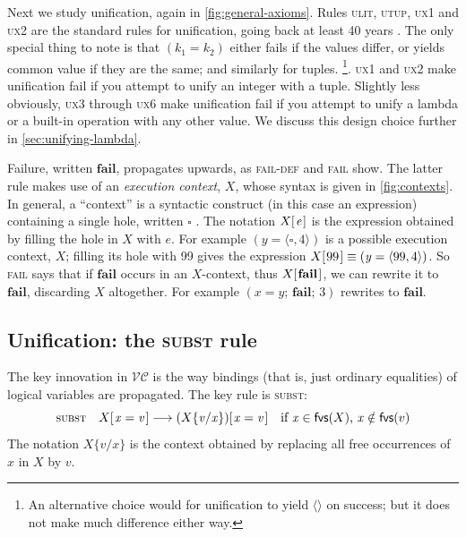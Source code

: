 \documentclass[acmsmall,review,dvipsnames]{acmart}
\newcommand{\Varid}[1]{\mathit{#1}}
\newcommand{\versecalc}{$\mathcal{VC}$}
\newcommand{\rulename}[1]{\textsc{\small #1}}
\newcommand{\hole}{\square}
\newcommand{\freevars}[1]{\mathsf{fvs}(#1)}
\newcommand{\subst}[3]{#1\{#3/#2\}}
\newcommand{\movesto}{\longrightarrow}
\begin{document}
Next we study unification, again in \cref{fig:general-axioms}.
Rules \rulename{ulit}, \rulename{utup}, \rulename{ux1} and \rulename{ux2}
are the standard rules for unification, going back at least 40 years \cite{MartelliMontanari82}.
The only special thing
to note is that \ensuremath{(\Varid{k}_{\mathrm{1}}\mathrel{=}\Varid{k}_{\mathrm{2}})} either fails if the values differ,
or yields common value if they are the same; and similarly for
tuples.%
\footnote{An alternative choice would
for unification to yield \ensuremath{\langle\rangle} on success; but it does not make much difference
either way.}.
\rulename{ux1} and \rulename{ux2} make unification fail if
you attempt to unify an integer with a tuple.
Slightly less obviously,
\rulename{ux3} through \rulename{ux6} make unification fail if you attempt to unify a
lambda or a built-in operation with any other value.  We discuss this design choice further in \cref{sec:unifying-lambda}.

Failure, written \ensuremath{\textbf{fail}}, propagates upwards, as \rulename{fail-def} and \rulename{fail} show. 
The latter rule makes use of an \emph{execution context}, \ensuremath{X},
whose syntax is given in \cref{fig:contexts}.
In general, a ``context'' is a syntactic construct (in this case an expression)
containing a single hole, written \ensuremath{\hole} \cite{felleisen:contexts1,felleisen:contexts2}.
The notation \ensuremath{X [\mskip1.5mu \Varid{e}\mskip1.5mu]} is the expression obtained by filling the hole
in \ensuremath{X} with \ensuremath{\Varid{e}}.
For example \ensuremath{(\Varid{y}\mathrel{=}\langle{}\hole,\mathrm{4}\rangle)} is a possible execution context, \ensuremath{X}; filling its hole with 99
gives the expression $\ensuremath{X [\mskip1.5mu \mathrm{99}\mskip1.5mu]} \equiv \ensuremath{(\Varid{y}\mathrel{=}\langle{}\mathrm{99},\mathrm{4}\rangle)}$.
So \rulename{fail} says that if \ensuremath{\textbf{fail}} occurs in an \ensuremath{X}-context, thus \ensuremath{X [\mskip1.5mu \textbf{fail}\mskip1.5mu]}, we can rewrite
it to \ensuremath{\textbf{fail}}, discarding \ensuremath{X} altogether. For example \ensuremath{(\Varid{x}\mathrel{=}\Varid{y};\,\textbf{fail};\,\mathrm{3})} rewrites to \ensuremath{\textbf{fail}}.

\subsection{Unification: the \rulename{subst} rule}

The key innovation in \versecalc{} is the way bindings (that is, just ordinary equalities)
of logical variables are propagated.
The key rule is \rulename{subst}:
$$
\rulename{subst} \quad \ensuremath{X [\mskip1.5mu \Varid{x}\mathrel{=}\Varid{v}\mskip1.5mu]}  \movesto  \ensuremath{(\subst{X}{\Varid{x}}{\Varid{v}}) [\mskip1.5mu \Varid{x}\mathrel{=}\Varid{v}\mskip1.5mu]}
        \quad \text{if $\ensuremath{\Varid{x}} \in \freevars{X}$, $\ensuremath{\Varid{x}} \notin \freevars{v}$} \\
$$
The notation \ensuremath{\subst{X}{\Varid{x}}{\Varid{v}}} is the context obtained by replacing all
free occurrences of \ensuremath{\Varid{x}} in \ensuremath{X} by \ensuremath{\Varid{v}}.
\end{document}
